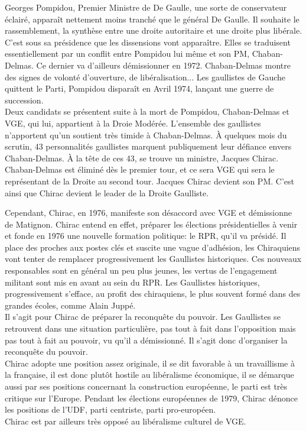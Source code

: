 \documentclass[10pt, a4paper, openany]{book}
\begin{document}
Georges Pompidou, Premier Ministre de De Gaulle, une sorte de conservateur éclairé, apparaît nettement moins tranché que le général De Gaulle. Il souhaite le rassemblement, la synthèse entre une droite autoritaire et une droite plus libérale. C'est sous sa présidence que les dissensions vont apparaître. Elles se traduisent essentiellement par un conflit entre Pompidou lui même et son PM, Chaban-Delmas. Ce dernier va d'ailleurs démissionner en 1972. Chaban-Delmas montre des signes de volonté d'ouverture, de libéralisation... Les gaullistes de Gauche quittent le Parti, Pompidou disparaît en Avril 1974, lançant une guerre de succession. \\
Deux candidats se présentent suite à la mort de Pompidou, Chaban-Delmas et VGE, qui lui, appartient à la Droie Modérée. L'ensemble des gaullistes n'apportent qu'un soutient très timide à Chaban-Delmas. À quelques mois du scrutin, 43 personnalités gaullistes marquent publiquement leur défiance envers Chaban-Delmas. À la tête de ces 43, se trouve un ministre, Jacques Chirac. Chaban-Delmas est éliminé dès le premier tour, et ce sera VGE qui sera le représentant de la Droite au second tour. Jacques Chirac devient son PM. C'est ainsi que Chirac devient le leader de la Droite Gaulliste.


Cependant, Chirac, en 1976, manifeste son désaccord avec VGE et démissionne de Matignon. Chirac entend en effet, préparer les élections présidentielles à venir et fonde en 1976 une nouvelle formation politique: le RPR, qu'il va présidé. Il place des proches aux postes clés et suscite une vague d'adhésion, les Chiraquiens vont tenter de remplacer progressivement les Gaullistes historiques. Ces nouveaux responsables sont en général un peu plus jeunes, les vertus de l'engagement militant sont mis en avant au sein du RPR. Les Gaullistes historiques, progressivement s'efface, au profit des chiraquiens, le plus souvent formé dans des grandes écoles, comme Alain Juppé. \\
Il s'agit pour Chirac de préparer la reconquête du pouvoir. Les Gaullistes se retrouvent dans une situation particulière, pas tout à fait dans l'opposition mais pas tout à fait au pouvoir, vu qu'il a démissionné. Il s'agit donc d'organiser la reconquête du pouvoir. \\
Chirac adopte une position assez originale, il se dit favorable à un travaillisme à la française, il est donc plutôt hostile au libéralisme économique, il se démarque aussi par ses positions concernant la construction européenne, le parti est très critique sur l'Europe. Pendant les élections européennes de 1979, Chirac dénonce les positions de l'UDF, parti centriste, parti pro-européen. \\
Chirac est par ailleurs très opposé au libéralisme culturel de VGE. 
\end{document}

